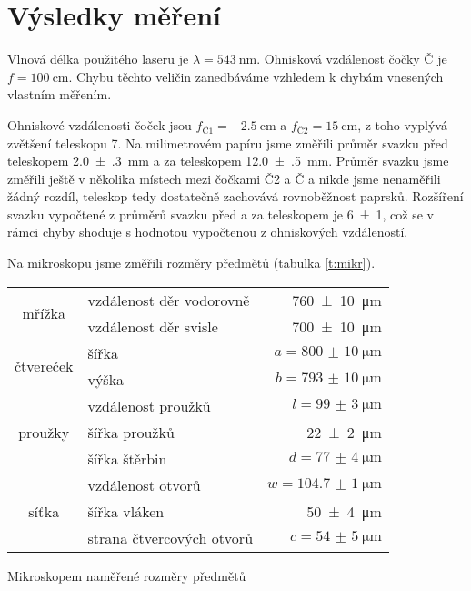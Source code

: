 \section*{Výsledky měření}
Vlnová délka použitého laseru je $\lambda=\SI{543}{\nm}$. Ohnisková vzdálenost čočky Č je $f=\SI{100}{\cm}$. Chybu těchto veličin zanedbáváme vzhledem k chybám vnesených vlastním měřením.

Ohniskové vzdálenosti čoček jsou $f_{\text{Č1}}=\SI{-2.5}{\cm}$ a $f_{\text{Č2}}=\SI{15}{\cm}$, z toho vyplývá zvětšení teleskopu 7.
Na milimetrovém papíru jsme změřili průměr svazku před teleskopem \SI{2.0(3)}{\mm} a za teleskopem \SI{12.0(5)}{\mm}. Průměr svazku jsme změřili ještě v několika místech mezi čočkami Č2 a Č a nikde jsme nenaměřili žádný rozdíl, teleskop tedy dostatečně zachovává rovnoběžnost paprsků. Rozšíření svazku vypočtené z průměrů svazku před a za teleskopem je \num{6(1)}, což se v rámci chyby shoduje s hodnotou vypočtenou z ohniskových vzdáleností.

Na mikroskopu jsme změřili rozměry předmětů (tabulka \ref{t:mikr}).
\begin{tabulka}[H]
\centering
\begin{tabular}{c||lr}
\multirow{2}{*}{mřížka} & vzdálenost děr vodorovně & \SI{760(10)}{\micro\metre} \\
& vzdálenost děr svisle & \SI{700(10)}{\micro\metre} \\ \hline

\multirow{2}{*}{čtvereček} & šířka & $a=\SI{800(10)}{\micro\metre}$ \\
& výška & $b=\SI{793(10)}{\micro\metre}$ \\ \hline

\multirow{3}{*}{proužky} & vzdálenost proužků & $l=\SI{99(3)}{\micro\metre}$ \\
& šířka proužků & \SI{22(2)}{\micro\metre} \\
& šířka štěrbin\footnotemark & $d=\SI{77(4)}{\micro\metre}$ \\ \hline

\multirow{3}{*}{síťka} & vzdálenost otvorů\footnotemark & $w=\SI{104.7(10)}{\micro\metre}$ \\
& šířka vláken & \SI{50(4)}{\micro\metre} \\
& strana čtvercových otvorů\footnotemark & $c=\SI{54(5)}{\micro\metre}$ \\
\end{tabular}
\caption{Mikroskopem naměřené rozměry předmětů}
\label{t:mikr}
\end{tabulka}


